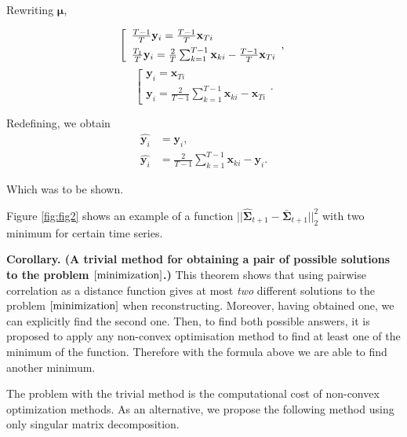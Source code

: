 \documentclass[12pt]{article}
\begin{document}
Rewriting $\boldsymbol{\mu}$,

$$
	\left[
	\begin{array}{ll}
		\frac{T-1}{T}\mathbf{y}_i = \frac{T-1}{T}\mathbf{x}_{Ti}
		\\[1ex]
		\frac{T_1}{T}\mathbf{y}_i = \frac{2}{T} \sum_{k=1}^{T-1} \mathbf{x}_{ki} - \frac{T-1}{T}\mathbf{x}_{Ti}
	\end{array},
	\right .\\[1ex]
$$
$$
	\left[
	\begin{array}{ll}
		\mathbf{y}_i = \mathbf{x}_{Ti}
		\\[1ex]
		\mathbf{y}_i = \frac{2}{T-1} \sum_{k=1}^{T-1} \mathbf{x}_{ki} - \mathbf{x}_{Ti}
	\end{array}.
	\right .
$$

Redefining, we obtain
\begin{align*}
	\hat{\mathbf{y}_i} &= \mathbf{y}_i,\\
	\hat{\mathbf{y}_i} &= \frac{2}{T-1} \sum_{k=1}^{T-1} \mathbf{x}_{ki} - \mathbf{y}_i.
\end{align*}

Which was to be shown.

Figure \ref{fig:fig2} shows an example of a function $||\hat{\mathbf{\Sigma}}_{t+1} - \bar{\mathbf{\Sigma}}_{t+1}||_2^2$ with two minimum for certain time series.

\textbf{Corollary. (A trivial method for obtaining a pair of possible solutions to the problem $\eqref{minimization}$.)} This theorem shows that using pairwise correlation as a distance function gives at most \emph{two} different solutions to the problem $\eqref{minimization}$ when reconstructing. Moreover, having obtained one, we can explicitly find the second one. Then, to find both possible answers, it is proposed to apply any non-convex optimisation method to find at least one of the minimum of the function. Therefore with the formula above we are able to find another minimum.

The problem with the trivial method is the computational cost of non-convex optimization methods. As an alternative, we propose the following method using only singular matrix decomposition.
\end{document}
